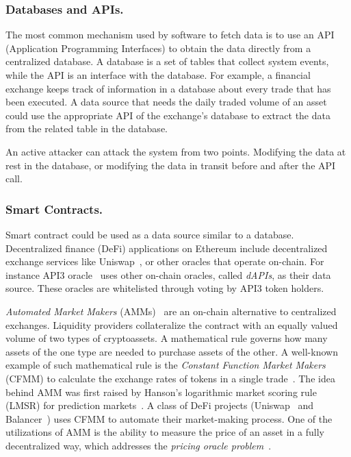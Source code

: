 \subsubsection{Databases and APIs.} 

The most common mechanism used by software to fetch data is to use an API (Application Programming Interfaces) to obtain the data directly from a centralized database. A database is a set of tables that collect system events, while the API is an interface with the database. For example, a financial exchange keeps track of information in a database about every trade that has been executed. A data source that needs the daily traded volume of an asset could use the appropriate API of the exchange's database to extract the data from the related table in the database.

An active attacker can attack the system from two points. Modifying the data at rest in the database, or modifying the data in transit before and after the API call. 

\subsubsection{Smart Contracts.}

Smart contract could be used as a data source similar to a database. Decentralized finance (DeFi) applications on Ethereum include decentralized exchange services like Uniswap~\cite{adams2019uniswap}, or other oracles that operate on-chain. For instance API3 oracle~\cite{benligiraydecentralized} uses other on-chain oracles, called \textit{dAPIs}, as their data source. These oracles are whitelisted through voting by API3 token holders.

\textit{Automated Market Makers} (AMMs)~\cite{wang2020automated} are an on-chain alternative to centralized exchanges. Liquidity providers collateralize the contract with an equally valued volume of two types of cryptoassets. A mathematical rule governs how many assets of the one type are needed to purchase assets of the other. A well-known example of such mathematical rule is the \textit{Constant Function Market Makers} (CFMM) to calculate the exchange rates of tokens in a single trade~\cite{uniswapexplained}. The idea behind AMM was first raised by Hanson's logarithmic market scoring rule (LMSR) for prediction markets~\cite{hanson2003combinatorial}. A class of DeFi projects (\eg Uniswap~\cite{adams2019uniswap,adams2021uniswap} and Balancer~\cite{balancer}) uses CFMM to automate their market-making process. One of the utilizations of AMM is the ability to measure the price of an asset in a fully decentralized way, which addresses the \textit{pricing oracle problem}~\cite{angeris2020improved}.


